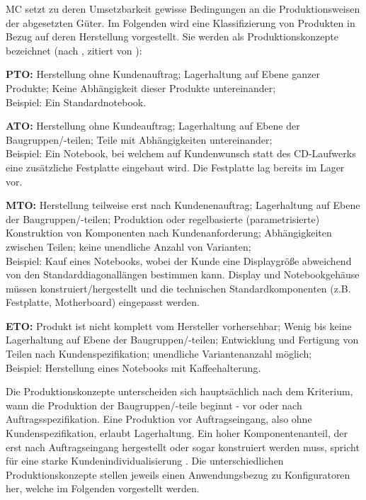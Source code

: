 \documentclass[12pt,a4paper,bibliography=totocnumbered,listof=totoc]{scrartcl}
\begin{document}
\ac{MC} setzt zu deren Umsetzbarkeit gewisse Bedingungen an die Produktionsweisen der abgesetzten Güter. Im Folgenden wird eine Klassifizierung von Produkten in Bezug auf deren Herstellung vorgestellt. Sie werden als Produktionskonzepte bezeichnet  (nach \citealt{schuh06}, zitiert von \citealt{lutz11}):
\begin{compactitem}
	\item \textbf{\ac{PTO}:} Herstellung ohne Kundenauftrag; Lagerhaltung auf Ebene ganzer Produkte; Keine Abhängigkeit dieser Produkte untereinander;\\
	Beispiel: Ein Standardnotebook.
	\item \textbf{\ac{ATO}:} Herstellung ohne Kundeauftrag; Lagerhaltung auf Ebene der Baugruppen/-teilen; Teile mit Abhängigkeiten untereinander;\\
	Beispiel: Ein Notebook, bei welchem auf Kundenwunsch statt des CD-Laufwerks eine zusätzliche Festplatte eingebaut wird. Die Festplatte lag bereits im Lager vor.
	\item \textbf{\ac{MTO}:} Herstellung teilweise erst nach Kundenenauftrag; Lagerhaltung auf Ebene der Baugruppen/-teilen; Produktion oder regelbasierte (parametrisierte) Konstruktion von Komponenten nach Kundenanforderung; Abhängigkeiten zwischen Teilen; keine unendliche Anzahl von Varianten;\\
		Beispiel: Kauf eines Notebooks, wobei der Kunde eine Displaygröße abweichend von den Standarddiagonallängen bestimmen kann. Display und Notebookgehäuse müssen konstruiert/hergestellt und die technischen Standardkomponenten (z.B. Festplatte, Motherboard) eingepasst werden. 
	\item \textbf{\ac{ETO}:} Produkt ist nicht komplett vom Hersteller vorhersehbar; Wenig bis keine Lagerhaltung auf Ebene der Baugruppen/-teilen; Entwicklung und Fertigung von Teilen nach Kundenspezifikation; unendliche Variantenanzahl möglich;\\
	Beispiel: Herstellung eines Notebooks mit Kaffeehalterung.
\end{compactitem}

Die Produktionskonzepte unterscheiden sich hauptsächlich nach dem Kriterium, wann die Produktion der Baugruppen/-teile beginnt - vor oder nach Auftragsspezifikation. Eine Produktion vor Auftragseingang, also ohne Kundenspezifikation, erlaubt Lagerhaltung. Ein hoher Komponentenanteil, der erst nach Auftragseingang hergestellt oder sogar konstruiert werden muss, spricht für eine starke Kundenindividualisierung \citep{lutz11}. Die unterschiedlichen Produktionskonzepte stellen jeweils einen Anwendungsbezug zu Konfiguratoren her, welche im Folgenden vorgestellt werden.
\end{document}
